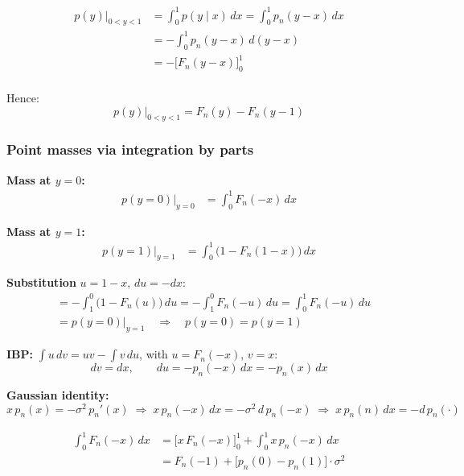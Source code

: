 \begin{align*}
p(y)\big|_{0 < y < 1}
  &= \int_0^1 p(y \mid x)\,dx
   = \int_0^1 p_n(y-x)\,dx \\
  &= -\int_0^1 p_n(y-x)\,d(y-x) \\
  &= -\bigl[F_n(y-x)\bigr]_0^1 \\
\end{align*}

Hence: 
\begin{equation}
    p(y)\big|_{0 < y < 1} = F_n(y) - F_n(y-1)
\end{equation}
\subsubsection*{Point masses via integration by parts}


\textbf{Mass at $y = 0$:}
\begin{align*}
p(y=0)\big|_{y=0}
  &= \int_0^1 F_n(-x)\,dx
\end{align*}

\textbf{Mass at $y = 1$:}
\begin{align*}
p(y=1)\big|_{y=1}
  &= \int_0^1 \bigl(1 - F_n(1-x)\bigr)\,dx
\end{align*}

\textbf{Substitution} $u = 1-x$, $du = -dx$:
\begin{align*}
  &= -\int_1^0 \bigl(1 - F_n(u)\bigr)\,du
   = -\int_1^0 F_n(-u)\,du
   = \int_0^1 F_n(-u)\,du \\
  &= p(y=0)\big|_{y=1} \quad \Rightarrow \quad p(y=0) = p(y=1)
\end{align*}

\textbf{IBP:} $\int u\,dv = uv - \int v\,du$, with
$u = F_n(-x)$, $v = x$:
\[
  dv = dx, \qquad du = -p_n(-x)\,dx = -p_n(x)\,dx
\]

\textbf{Gaussian identity:}
\[
  x\,p_n(x) = -\sigma^2\,p_n'(x)
  \;\Longrightarrow\;
  x\,p_n(-x)\,dx = -\sigma^2\,d\,p_n(-x)
  \;\Longrightarrow\;
  x\,p_n(n)\,dx = -d\,p_n(\cdot)
\]

\begin{align*}
\int_0^1 F_n(-x)\,dx
  &= \bigl[x\,F_n(-x)\bigr]_0^1 + \int_0^1 x\,p_n(-x)\,dx \\
  &= F_n(-1) + \bigl[p_n(0) - p_n(1)\bigr] \cdot \sigma^2
\end{align*}

